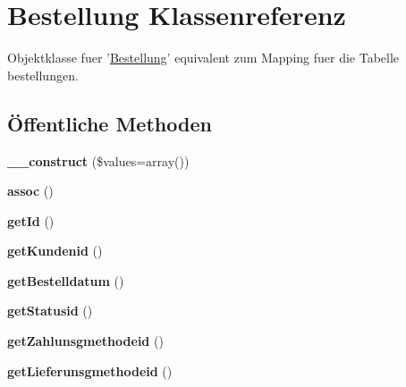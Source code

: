 \hypertarget{classBestellung}{\section{\-Bestellung \-Klassenreferenz}
\label{classBestellung}
}


\-Objektklasse fuer '\hyperlink{classBestellung}{\-Bestellung}' equivalent zum \-Mapping fuer die \-Tabelle bestellungen.  


\subsection*{Öffentliche \-Methoden}
\begin{DoxyCompactItemize}
\item 
\hypertarget{classBestellung_a2a2fb909389e1336f8cb87a2a3126c39}{{\bfseries \-\_\-\-\_\-construct} (\$values=array())}\label{classBestellung_a2a2fb909389e1336f8cb87a2a3126c39}

\item 
\hypertarget{classBestellung_ace567e8783a4ac50e05aef811b55af36}{{\bfseries assoc} ()}\label{classBestellung_ace567e8783a4ac50e05aef811b55af36}

\item 
\hypertarget{classBestellung_ac433ecde97ce5cd8d0b7fc1884af9c87}{{\bfseries get\-Id} ()}\label{classBestellung_ac433ecde97ce5cd8d0b7fc1884af9c87}

\item 
\hypertarget{classBestellung_aa619806e97a28b612f48fa0ce7172b72}{{\bfseries get\-Kundenid} ()}\label{classBestellung_aa619806e97a28b612f48fa0ce7172b72}

\item 
\hypertarget{classBestellung_a44ade1e87e9b50d6a2083cca2bbf1740}{{\bfseries get\-Bestelldatum} ()}\label{classBestellung_a44ade1e87e9b50d6a2083cca2bbf1740}

\item 
\hypertarget{classBestellung_ad55c638858814b844270f4ec9b81dc07}{{\bfseries get\-Statusid} ()}\label{classBestellung_ad55c638858814b844270f4ec9b81dc07}

\item 
\hypertarget{classBestellung_a7b488df594f8a70fdd2104598f1f7d54}{{\bfseries get\-Zahlunsgmethodeid} ()}\label{classBestellung_a7b488df594f8a70fdd2104598f1f7d54}

\item 
\hypertarget{classBestellung_a4276c382393de1f18ee5c2799a9bf473}{{\bfseries get\-Lieferunsgmethodeid} ()}\label{classBestellung_a4276c382393de1f18ee5c2799a9bf473}

\end{DoxyCompactItemize}


